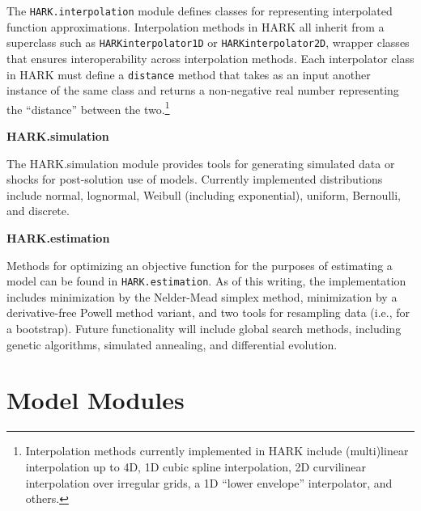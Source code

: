 \documentclass[10pt,twocolumn]{article}
\let\rmarkdownfootnote\footnote%
\def\footnote{\protect\rmarkdownfootnote}
\begin{document}
The \texttt{HARK.interpolation} module defines classes for representing interpolated function approximations. Interpolation methods in HARK all inherit from a superclass such as \texttt{HARKinterpolator1D} or \texttt{HARKinterpolator2D}, wrapper classes that ensures interoperability across interpolation methods. Each interpolator class in HARK must define a \texttt{distance} method that takes as an input another instance of the same class and returns a non-negative real number representing the ``distance'' between the two.\footnote{Interpolation methods currently implemented in HARK include (multi)linear interpolation up to 4D, 1D cubic spline interpolation, 2D curvilinear interpolation over irregular grids, a 1D ``lower envelope'' interpolator, and others.}

\textbf{HARK.simulation}

The HARK.simulation module provides tools for generating simulated data
or shocks for post-solution use of models. Currently implemented
distributions include normal, lognormal, Weibull (including
exponential), uniform, Bernoulli, and discrete.

\textbf{HARK.estimation}

Methods for optimizing an objective function for the purposes of estimating a model can be found in \texttt{HARK.estimation}. As of this writing, the implementation includes minimization by the Nelder-Mead simplex method, minimization by a derivative-free Powell method variant, and two tools for resampling data (i.e., for a bootstrap). Future functionality will include global search methods, including genetic algorithms, simulated annealing, and differential evolution.

\section{\texorpdfstring{Model Modules
\label{sec:model-modules}}{Model Modules }}\label{model-modules}
\end{document}
